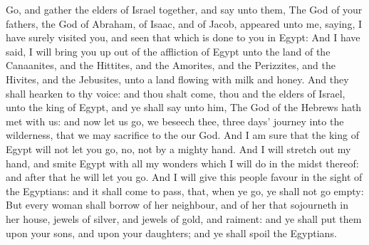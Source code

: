 \begin{biblechapter}
\verse Go, and gather the elders of Israel together, and say unto them, The \LORD God of your fathers, the God of Abraham, of Isaac, and of Jacob, appeared unto me, saying, I have surely visited you, and seen that which is done to you in Egypt:
\verse And I have said, I will bring you up out of the affliction of Egypt unto the land of the Canaanites, and the Hittites, and the Amorites, and the Perizzites, and the Hivites, and the Jebusites, unto a land flowing with milk and honey.
\verse And they shall hearken to thy voice: and thou shalt come, thou and the elders of Israel, unto the king of Egypt, and ye shall say unto him, The \LORD God of the Hebrews hath met with us: and now let us go, we beseech thee, three days' journey into the wilderness, that we may sacrifice to the \LORD our God.
\verse And I am sure that the king of Egypt will not let you go, no, not by a mighty hand.
\verse And I will stretch out my hand, and smite Egypt with all my wonders which I will do in the midst thereof: and after that he will let you go.
\verse And I will give this people favour in the sight of the Egyptians: and it shall come to pass, that, when ye go, ye shall not go empty:
\verse But every woman shall borrow of her neighbour, and of her that sojourneth in her house, jewels of silver, and jewels of gold, and raiment: and ye shall put them upon your sons, and upon your daughters; and ye shall spoil the Egyptians.
\end{biblechapter}

